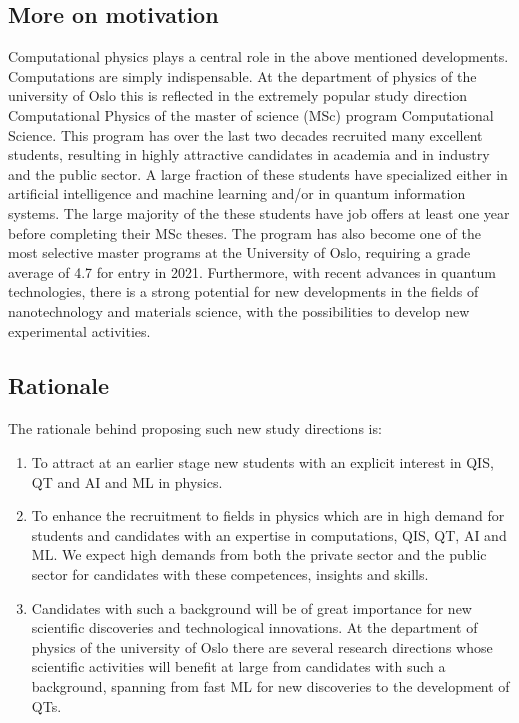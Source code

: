 \documentclass[%
oneside,                 %
final,                   %
10pt]{article}
\begin{document}
\subsection{More on motivation}

Computational physics plays a central role in the above mentioned
developments.  Computations are simply indispensable.  At the
department of physics of the university of Oslo this is reflected in
the extremely popular study direction Computational Physics of the
master of science (MSc) program Computational Science. This program
has over the last two decades recruited many excellent students,
resulting in highly attractive candidates in academia and in industry
and the public sector. A large fraction of these students have
specialized either in artificial intelligence and machine learning
and/or in quantum information systems.  The large majority of the
these students have job offers at least one year before completing
their MSc theses. The program has also become one of the most
selective master programs at the University of Oslo, requiring a grade
average of 4.7 for entry in 2021. Furthermore, with recent advances in
quantum technologies, there is a strong potential for new developments
in the fields of nanotechnology and materials science, with the
possibilities to develop new experimental activities.

\subsection{Rationale}


\paragraph{}
The rationale behind proposing such new study directions is:
\begin{enumerate}
\item To attract at an earlier stage new students with an explicit interest in QIS, QT and AI and ML in physics. 

\item To enhance the recruitment to fields in physics which are in high demand for students and candidates with an expertise in computations, QIS, QT, AI and ML. We expect high demands from both the private sector and the public sector for candidates with these competences, insights and skills.

\item Candidates with such a background will be of great importance for new scientific discoveries and technological innovations. At the department of physics of the university of Oslo there are several research directions whose scientific activities will benefit at large from candidates with such a background, spanning from fast ML for new discoveries to the development of QTs.   
\end{enumerate}
\end{document}
